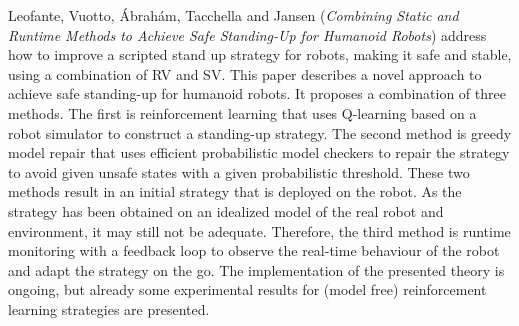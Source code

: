 

Leofante, Vuotto, \'{A}brah\'{a}m, Tacchella and Jansen
\cite{isola-2016-leofante}
({\em Combining Static and Runtime Methods to Achieve 
      Safe Standing-Up for Humanoid Robots})
address how to improve a scripted stand up strategy for robots, making
it safe and stable, using a combination of RV and SV. 
This paper describes a novel approach to achieve safe standing-up for humanoid robots. It proposes a combination of three methods. The first is reinforcement learning that uses Q-learning based on a robot simulator to construct a standing-up strategy. The second method is greedy model repair that uses efficient probabilistic model checkers to repair the strategy to avoid given unsafe states with a given probabilistic threshold. These two methods result in an initial strategy that is deployed on the robot. As the strategy has been obtained on an idealized model of the real robot and environment, it may still not be adequate. Therefore, the third method is runtime monitoring with a feedback loop to observe the real-time behaviour of the robot and adapt the strategy on the go. 
The implementation of the presented theory is
ongoing, but already some experimental results for (model free)
reinforcement learning strategies are presented.

